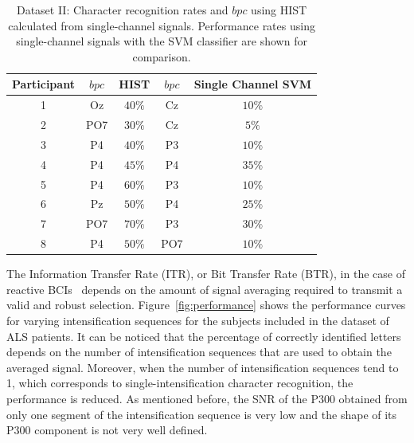 \begin{table}[h!]
\caption[Dataset II - Single Channel Character Recognition Rates]{Dataset II: Character recognition rates and $bpc$  using HIST calculated from  single-channel signals.  Performance rates using single-channel signals with the SVM classifier are shown for comparison.}
\centering
\begin{tabular}{c|cc|cc}
\toprule
\textbf{Participant}	&  $bpc$	&  HIST &  $bpc$	&  Single Channel SVM \\
\midrule
1     &     Oz   &   $40\%$  &  Cz   &  $10\%$    \\
2     &     PO7   &   $30\%$      &  Cz   & $5\%$   \\
3     &     P4   &   $40\%$    &  P3   & $10\%$    \\
4     &     P4 &   $45\%$    &  P4   & $35\%$     \\
5     &     P4 &   $60\%$  &  P3   & $10\%$     \\
6     &     Pz &   $50\%$ &  P4   & $25\%$     \\
7     &     PO7 &   $70\%$  &  P3   & $30\%$     \\
8     &     P4 &   $50\%$    &  PO7   & $10\%$    \\

\end{tabular}
\label{tab:resultsown}
\end{table}



The Information Transfer Rate (ITR), or Bit Transfer Rate (BTR), in the case of reactive BCIs~\cite{WolpawJonathanR2012}  depends on the amount of signal averaging required to transmit a valid and robust selection.  Figure~\ref{fig:performance} shows the performance curves for varying intensification sequences for the subjects included in the dataset of ALS patients. It can be noticed that the percentage of correctly identified letters depends on the number of intensification sequences that are used to obtain the averaged signal.  Moreover, when the number of intensification sequences tend to 1, which corresponds to single-intensification character recognition, the performance is reduced. As mentioned before, the SNR of the P300 obtained from only one segment of the intensification sequence is very low and the shape of its P300 component is not very well defined.



